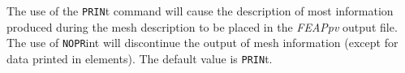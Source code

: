 \headb

The use of the {\tt PRIN}t command will cause the description
of most information produced during the mesh description to be
placed in the {\sl FEAPpv} output file.  The use of {\tt NOPR}int will
discontinue the output of mesh information (except for data
printed in elements). The default value is {\tt PRIN}t.
\vfil\eject
